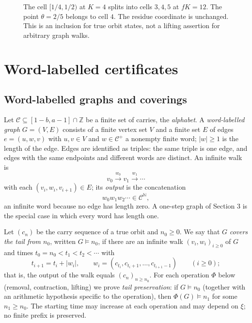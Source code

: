 \documentclass[11pt,reqno]{amsart}
\theoremstyle{definition}
\theoremstyle{remark}
\begin{document}
\begin{figure}[htbp]
\centering

\caption{The cell \([1/4,1/2)\) at \(K=4\) splits into cells \(3,4,5\) at \(fK=12\). The point \(\theta=2/5\) belongs to cell \(4\). The residue coordinate is unchanged. This is an inclusion for true orbit states, not a lifting assertion for arbitrary graph walks.}
\label{fig:cell-refinement}
\end{figure}

\section{Word-labelled certificates}\label{sec:4}

\subsection{Word-labelled graphs and coverings}\label{sec:4.1}

Let \(\mathcal C\subseteq[1-b,a-1]\cap\mathbb Z\) be a finite set of
carries, the \emph{alphabet}. A \emph{word-labelled graph} \(G=(V,E)\) consists of
a finite vertex set \(V\) and a finite set \(E\) of edges
\(e=(u,w,v)\) with \(u,v\in V\) and \(w\in\mathcal C^{+}\) a nonempty
finite word; \(|w|\ge1\) is the length of the edge. Edges are identified
as triples: the same triple is one edge, and edges with the same
endpoints and different words are distinct. An infinite walk is
\[
v_0\xrightarrow{w_0}v_1\xrightarrow{w_1}\cdots
\]
with each
\((v_i,w_i,v_{i+1})\in E\); its \emph{output} is the concatenation
\[
w_0w_1w_2\cdots\in\mathcal C^{\mathbb N},
\]
an infinite word because no
edge has length zero. A one-step graph of Section 3 is the special case
in which every word has length one.

Let \((c_n)\) be the carry sequence of a true orbit and \(n_0\ge0\). We
say that \(G\) \emph{covers the tail from \(n_0\)}, written
\(G\models n_0\), if there are an infinite walk \((v_i,w_i)_{i\ge0}\) of
\(G\) and times \(t_0=n_0<t_1<t_2<\cdots\) with
\[
t_{i+1}=t_i+|w_i|,\qquad
w_i=(c_{t_i},c_{t_i+1},\ldots,c_{t_{i+1}-1})\qquad(i\ge0);
\]
that is, the output of the walk equals \((c_n)_{n\ge n_0}\). For each
operation \(\Phi\) below (removal, contraction, lifting) we prove \emph{tail
preservation}: if \(G\models n_0\) (together with an arithmetic
hypothesis specific to the operation), then \(\Phi(G)\models n_1\) for
some \(n_1\ge n_0\). The starting time may increase at each operation and
may depend on \(\xi\); no finite prefix is preserved.
\end{document}
